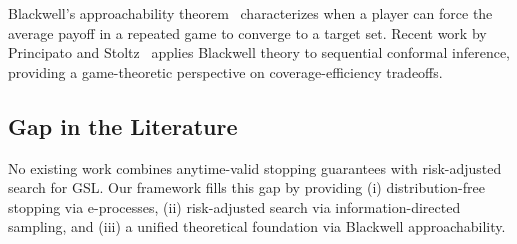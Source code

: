 Blackwell's approachability theorem~\cite{ref12} characterizes when a player can force the average payoff in a repeated game to converge to a target set. Recent work by Principato and Stoltz~\cite{ref13} applies Blackwell theory to sequential conformal inference, providing a game-theoretic perspective on coverage-efficiency tradeoffs.

\subsection{Gap in the Literature}

No existing work combines anytime-valid stopping guarantees with risk-adjusted search for GSL. Our framework fills this gap by providing (i) distribution-free stopping via e-processes, (ii) risk-adjusted search via information-directed sampling, and (iii) a unified theoretical foundation via Blackwell approachability.